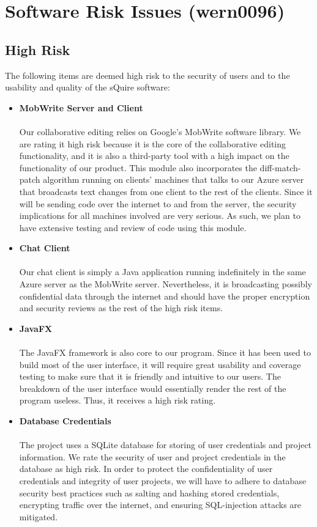 \documentclass[14pt, a4paper]{article}
\begin{document}
\newpage
\section{Software Risk Issues (wern0096)}

\subsection{High Risk}

The following items are deemed high risk to the security of users and to the usability and quality of the sQuire software:

\begin{itemize}
	\item \textbf{MobWrite Server and Client} \\ \\
	Our collaborative editing relies on Google's MobWrite software library. We are rating it high risk because it is the core of the collaborative editing functionality, and it is also a third-party tool with a high impact on the functionality of our product. This module also incorporates the diff-match-patch algorithm running on clients' machines that talks to our Azure server that broadcasts text changes from one client to the rest of the clients. Since it will be sending code over the internet to and from the server, the security implications for all machines involved are very serious. As such, we plan to have extensive testing and review of code using this module.
	\item \textbf{Chat Client} \\ \\
	Our chat client is simply a Java application running indefinitely in the same Azure server as the MobWrite server. Nevertheless, it is broadcasting possibly confidential data through the internet and should have the proper encryption and security reviews as the rest of the high risk items.
	\item \textbf{JavaFX} \\ \\
	The JavaFX framework is also core to our program. Since it has been used to build most of the user interface, it will require great usability and coverage testing to make sure that it is friendly and intuitive to our users. The breakdown of the user interface would essentially render the rest of the program useless. Thus, it receives a high risk rating.
	\item \textbf{Database Credentials} \\ \\
	The project uses a SQLite database for storing of user credentials and project information. We rate the security of user and project credentials in the database as high risk. In order to protect the confidentiality of user credentials and integrity of user projects, we will have to adhere to database security best practices such as salting and hashing stored credentials, encrypting traffic over the internet, and ensuring SQL-injection attacks are mitigated.
\end{itemize}
\end{document}
